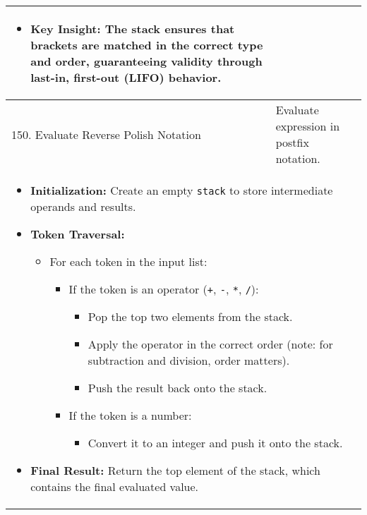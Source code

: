 \begin{summary}
\begin{center}
\begin{tabular}{ll}
{\begin{itemize}
                    \item \textbf{Key Insight:}  The stack ensures that brackets are matched in the correct type and order, guaranteeing validity through last-in, first-out (LIFO) behavior.
                \end{itemize}                
            } \\
            \midrule
            150. Evaluate Reverse Polish Notation & Evaluate expression in postfix notation. \\
            \multicolumn{2}{p{\linewidth}}{
                \begin{itemize}
                    \item \textbf{Initialization:} Create an empty \texttt{stack} to store intermediate operands and results.
                
                    \item \textbf{Token Traversal:}
                    \begin{itemize}
                        \item For each token in the input list:
                        \begin{itemize}
                            \item If the token is an operator (\texttt{+}, \texttt{-}, \texttt{*}, \texttt{/}):
                            \begin{itemize}
                                \item Pop the top two elements from the stack.
                                \item Apply the operator in the correct order (note: for subtraction and division, order matters).
                                \item Push the result back onto the stack.
                            \end{itemize}
                            \item If the token is a number:
                            \begin{itemize}
                                \item Convert it to an integer and push it onto the stack.
                            \end{itemize}
                        \end{itemize}
                    \end{itemize}
                
                    \item \textbf{Final Result:} Return the top element of the stack, which contains the final evaluated value.
                

\end{itemize}}
\end{tabular}
\end{center}
\end{summary}
